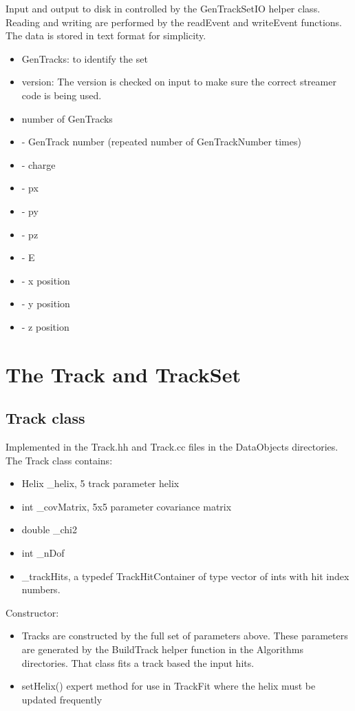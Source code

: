 \documentclass[aps,prd,superscriptaddress,floatfix]{revtex4}
\begin{document}
Input and output to disk in controlled by the GenTrackSetIO helper class.  Reading and writing
are performed by the readEvent and writeEvent functions.
\\

The data is stored in text format for simplicity.

\begin{itemize}
\item  GenTracks: to identify the set
\item version: The version is checked on input to make sure the correct streamer code is being used.
\item number of GenTracks
\item - GenTrack number (repeated number of GenTrackNumber times)
\item - charge
\item - px
\item - py
\item - pz
\item - E
\item - x position
\item - y position
\item - z position
\end{itemize}

\section{The Track and TrackSet}
\subsection{Track class}
Implemented in the Track.hh and Track.cc files in the DataObjects directories.
\\

The Track class contains:
\begin{itemize}
\item Helix \_helix, 5 track parameter helix
\item int \_covMatrix, 5x5 parameter covariance matrix
\item double \_chi2
\item int \_nDof
\item \_trackHits, a typedef TrackHitContainer of type vector of ints with hit index numbers.
\end{itemize}


Constructor:
\begin{itemize}
\item Tracks are constructed by the full set of parameters above.  These parameters
are generated by the BuildTrack helper function in the Algorithms directories.
That class fits a track based the input hits.
\item setHelix() expert method for use in TrackFit where the helix must be updated frequently
\end{itemize}
\end{document}
